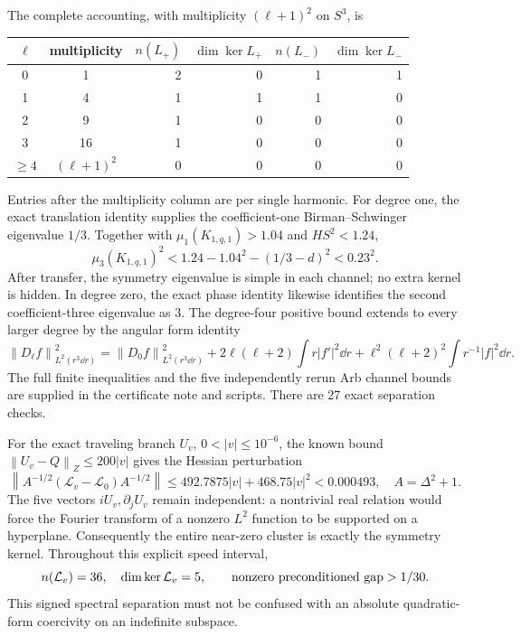\documentclass[11pt,a4paper]{article}
\theoremstyle{remark}\newtheorem{remark}[theorem]{Remark}
\newcommand{\norm}[1]{\left\|#1\right\|}
\begin{document}
The complete accounting, with multiplicity $(\ell+1)^2$ on $S^3$, is
\begin{center}
\begin{tabular}{@{}ccrrrr@{}}
\toprule
$\ell$ & multiplicity & $n(L_+)$ & $\dim\ker L_+$ & $n(L_-)$ & $\dim\ker L_-$\\
\midrule
0&1&2&0&1&1\\
1&4&1&1&1&0\\
2&9&1&0&0&0\\
3&16&1&0&0&0\\
$\ge4$&$(\ell+1)^2$&0&0&0&0\\
\bottomrule
\end{tabular}
\end{center}
Entries after the multiplicity column are per single harmonic. For degree one, the exact translation identity supplies the coefficient-one Birman--Schwinger eigenvalue $1/3$. Together with $\mu_1(K_{1,q,1})>1.04$ and $HS^2<1.24$,
\[
 \mu_3(K_{1,q,1})^2
 <1.24-1.04^2-(1/3-d)^2<0.23^2.
\]
After transfer, the symmetry eigenvalue is simple in each channel; no extra kernel is hidden. In degree zero, the exact phase identity likewise identifies the second coefficient-three eigenvalue as $3$. The degree-four positive bound extends to every larger degree by the angular form identity
\[
 \norm{D_\ell f}_{L^2(r^3\dd r)}^2=
 \norm{D_0f}_{L^2(r^3\dd r)}^2+
 2\ell(\ell+2)\int r|f'|^2\dd r+
 \ell^2(\ell+2)^2\int r^{-1}|f|^2\dd r.
\]
The full finite inequalities and the five independently rerun Arb channel bounds are supplied in the certificate note and scripts. There are 27 exact separation checks.

For the exact traveling branch $U_v$, $0<|v|\le10^{-6}$, the known bound $\norm{U_v-Q}_Z\le200|v|$ gives the Hessian perturbation
\[
 \norm{A^{-1/2}(\mathcal L_v-\mathcal L_0)A^{-1/2}}
 \le492.7875|v|+468.75|v|^2<0.000493,
 \quad A=\Delta^2+1.
\]
The five vectors $iU_v,\partial_jU_v$ remain independent: a nontrivial real relation would force the Fourier transform of a nonzero $L^2$ function to be supported on a hyperplane. Consequently the entire near-zero cluster is exactly the symmetry kernel. Throughout this explicit speed interval,
\[
 n(\mathcal L_v)=36,\quad\dim\ker\mathcal L_v=5,
 \qquad\hbox{nonzero preconditioned gap}>1/30.
\]
This signed spectral separation must not be confused with an absolute quadratic-form coercivity on an indefinite subspace.
\end{document}
